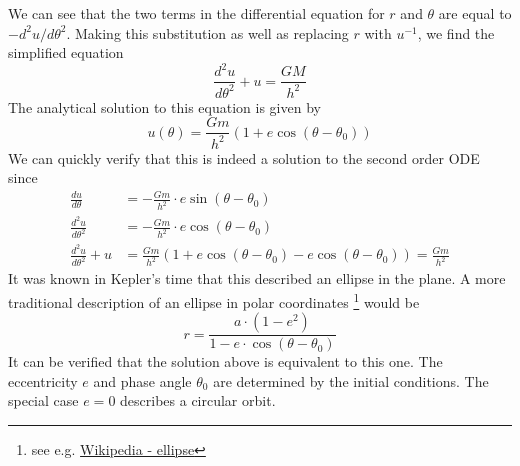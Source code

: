 We can see that the two terms in the differential equation for $r$ and $\theta$ are equal to $-d^2u / d\theta^2$.
Making this substitution as well as replacing $r$ with $u^{-1}$, we find the simplified equation
$$ \frac{d^2u}{d\theta^2} + u = \frac{GM}{h^2}$$
The analytical solution to this equation is given by
$$u(\theta) = \frac{Gm}{h^2} \left(1 + e \cos(\theta - \theta_0) \right)$$
We can quickly verify that this is indeed a solution to the second order ODE since
\begin{align*}
\frac{du}{d\theta} &= -\frac{Gm}{h^2} \cdot e \sin(\theta - \theta_0) \\
\frac{d^2u}{d\theta^2} &= -\frac{Gm}{h^2} \cdot e \cos(\theta - \theta_0) \\
\frac{d^2u}{d\theta^2} + u &= \frac{Gm}{h^2} \left( 1 + e \cos(\theta-\theta_0) - e \cos(\theta - \theta_0) \right) = \frac{Gm}{h^2}
\end{align*}
It was known in Kepler's time that this described an ellipse in the plane.
A more traditional description of an ellipse in polar coordinates 
\footnote{see e.g. \href{https://en.wikipedia.org/wiki/Ellipse}{Wikipedia - ellipse}} would be
$$ r = \frac{a\cdot(1-e^2)}{1 - e \cdot \cos(\theta - \theta_0)}$$
It can be verified that the solution above is equivalent to this one.
The eccentricity $e$ and phase angle $\theta_0$ are determined by the initial conditions.
The special case $e=0$ describes a circular orbit.

